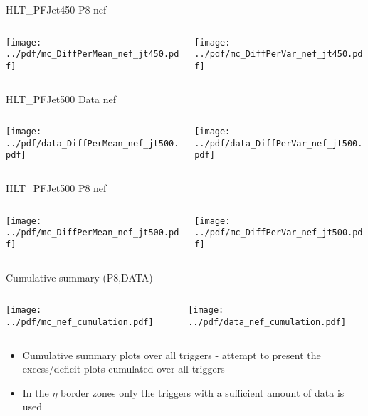 \documentclass[9pt]{beamer}
\begin{document}
\begin{frame}[t]{HLT\_PFJet450 P8 nef}
\begin{columns}[T]
  \begin{column}{.5\textwidth}
  \texttt{[image: ../pdf/mc\_DiffPerMean\_nef\_jt450.pdf]}
  \end{column}
  \begin{column}{.5\textwidth}
  \texttt{[image: ../pdf/mc\_DiffPerVar\_nef\_jt450.pdf]}
  \end{column}
\end{columns}
\end{frame}

\begin{frame}[t]{HLT\_PFJet500 Data nef}
\begin{columns}[T]
  \begin{column}{.5\textwidth}
  \texttt{[image: ../pdf/data\_DiffPerMean\_nef\_jt500.pdf]}
  \end{column}
  \begin{column}{.5\textwidth}
  \texttt{[image: ../pdf/data\_DiffPerVar\_nef\_jt500.pdf]}
  \end{column}
\end{columns}
\end{frame}

\begin{frame}[t]{HLT\_PFJet500 P8 nef}
\begin{columns}[T]
  \begin{column}{.5\textwidth}
  \texttt{[image: ../pdf/mc\_DiffPerMean\_nef\_jt500.pdf]}
  \end{column}
  \begin{column}{.5\textwidth}
  \texttt{[image: ../pdf/mc\_DiffPerVar\_nef\_jt500.pdf]}
  \end{column}
\end{columns}
\end{frame}

\begin{frame}[t]{Cumulative summary (P8,DATA)}
\begin{columns}[T]
  \begin{column}{.5\textwidth}
  \texttt{[image: ../pdf/mc\_nef\_cumulation.pdf]}
  \end{column}
  \begin{column}{.5\textwidth}
  \texttt{[image: ../pdf/data\_nef\_cumulation.pdf]}
  \end{column}
\end{columns}
\begin{itemize}
 \item Cumulative summary plots over all triggers - attempt to present the excess/deficit plots cumulated over all triggers
 \item In the $\eta$ border zones only the triggers with a sufficient amount of data is used
\end{itemize}
\end{frame}
\end{document}
